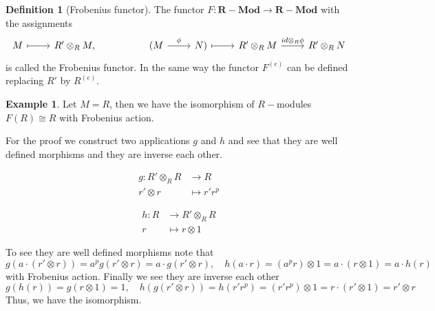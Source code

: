 \documentclass[leqno]{article}
\theoremstyle{definition}
\newtheorem{definition}{Definition}[section]
\newtheorem{example}{Example}[section]
\newcommand{\catname}[1]{{\mathbf{#1}}}
\newcommand{\Mod}{\catname{R-Mod}}
\begin{document}
\begin{definition}[Frobenius functor] The functor $F:\Mod \to \Mod$ with the assignments 
\[\begin{tikzcd}
	M & {R'\otimes_RM,} && {(M} & {N)} & {R'\otimes_R M} & {R'\otimes_RN}
	\arrow["\phi", from=1-4, to=1-5]
	\arrow["{id\otimes_R\phi}", from=1-6, to=1-7]
	\arrow[maps to, from=1-5, to=1-6]
	\arrow[maps to, from=1-1, to=1-2]
\end{tikzcd}\]
is called the Frobenius functor. In the same way the functor $F ^{(e)}$ can be defined replacing $R'$ by  $R ^{(e)}$.
\end{definition}

\begin{example} Let $M = R$, then we have the isomorphism of $R-$modules $F(R) \cong R$ with Frobenius action.

For the proof we construct two applications $g$ and  $h$ and see that they are well defined morphisms and they are inverse each other.

 \begin{minipage}{0.5\textwidth}
   \begin{align*}
	 g: R'\otimes _R R &\to  R \\
	 r'\otimes r &\mapsto r'r^p
   \end{align*}
\end{minipage}
\begin{minipage}{0.5\textwidth}
\begin{align*}
  h: R &\to  R'\otimes_R R\\
  r&\mapsto r\otimes 1
\end{align*}
\end{minipage}
\end{example}

To see they are well defined morphisms note that 
\[
g(a \cdot (r'\otimes r)) = a^p g(r'\otimes r) = a\cdot g(r'\otimes r), \quad h(a\cdot r)= (a^pr)\otimes 1 = a\cdot (r \otimes 1) = a \cdot h(r)
\]
with Frobenius action. Finally we see they are inverse each other
\[
g(h(r)) = g(r\otimes 1) = 1, \quad h(g(r'\otimes r)) = h(r'r^p) = (r'r^p)\otimes 1 = r\cdot (r'\otimes 1) = r'\otimes r
\] 
Thus, we have the isomorphism.
\end{document}
